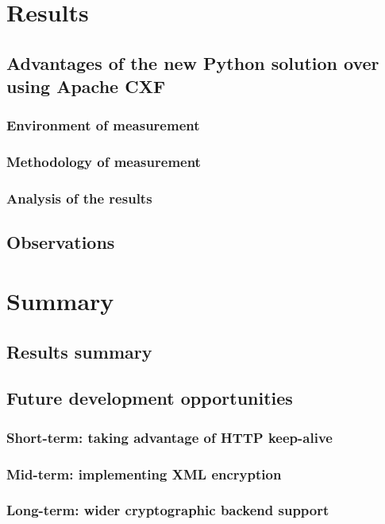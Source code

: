 \chapter{Results}

\section{Advantages of the new Python solution over using Apache CXF}

\subsection{Environment of measurement}

\subsection{Methodology of measurement}

\subsection{Analysis of the results}

\section{Observations}

\chapter{Summary}

\section{Results summary}

\section{Future development opportunities}

\subsection{Short-term: taking advantage of HTTP keep-alive}

\subsection{Mid-term: implementing XML encryption}

\subsection{Long-term: wider cryptographic backend support}
